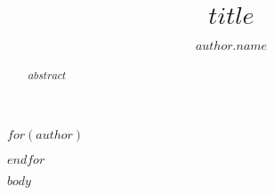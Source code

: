 \documentclass[a4paper,table]{article}
\begin{document}
%
\title{$title$}
%
%
$for(author)$
\author{
	$author.name$%
}

$endfor$



\date{}

%
\maketitle              %
%
\begin{abstract}
$abstract$
\end{abstract}


$body$

\printbibliography
%
%
%
\end{document}
